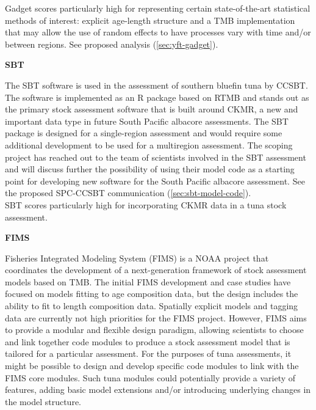 \documentclass{SCreport}
\begin{document}
Gadget scores particularly high for representing certain state-of-the-art
statistical methods of interest: explicit age-length structure and a TMB
implementation that may allow the use of random effects to have processes vary
with time and/or between regions. See proposed analysis
(\autoref{sec:yft-gadget}).

\vspace{1ex}

\textbf{SBT}
\label{sbt-software-evaluation}

\vspace{-1ex}

The SBT software is used in the assessment of southern bluefin tuna by CCSBT.
The software is implemented as an R package based on RTMB and stands out as the
primary stock assessment software that is built around CKMR, a new and important
data type in future South Pacific albacore assessments. The SBT package is
designed for a single-region assessment and would require some additional
development to be used for a multiregion assessment. The scoping project has
reached out to the team of scientists involved in the SBT assessment and will
discuss further the possibility of using their model code as a starting point
for developing new software for the South Pacific albacore assessment. See the
proposed SPC-CCSBT communication (\autoref{sec:sbt-model-code}).\\[-4.5ex]

SBT scores particularly high for incorporating CKMR data in a tuna stock
assessment.

\vspace{1ex}

\textbf{FIMS}
\label{sec:fims-software-evaluation}

\vspace{-1ex}

Fisheries Integrated Modeling System (FIMS) is a NOAA project that coordinates
the development of a next-generation framework of stock assessment models based
on TMB. The initial FIMS development and case studies have focused on models
fitting to age composition data, but the design includes the ability to fit to
length composition data. Spatially explicit models and tagging data are
currently not high priorities for the FIMS project. However, FIMS aims to
provide a modular and flexible design paradigm, allowing scientists to choose
and link together code modules to produce a stock assessment model that is
tailored for a particular assessment. For the purposes of tuna assessments, it
might be possible to design and develop specific code modules to link with the
FIMS core modules. Such tuna modules could potentially provide a variety of
features, adding basic model extensions and/or introducing underlying changes in
the model structure.
\end{document}
